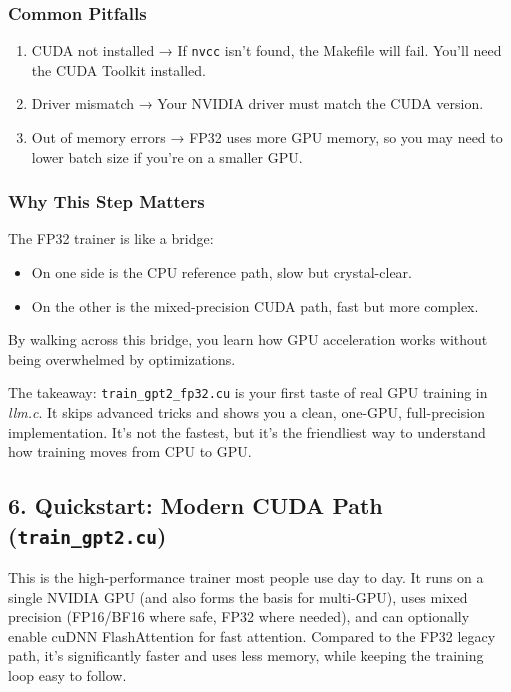 \documentclass[
  letterpaper,
  DIV=11,
  numbers=noendperiod]{scrreprt}
\providecommand{\tightlist}{%
  \setlength{\itemsep}{0pt}\setlength{\parskip}{0pt}}
\begin{document}
\subsubsection{Common Pitfalls}\label{common-pitfalls}

\begin{enumerate}
\def\labelenumi{\arabic{enumi}.}
\tightlist
\item
  CUDA not installed → If \texttt{nvcc} isn't found, the Makefile will
  fail. You'll need the CUDA Toolkit installed.
\item
  Driver mismatch → Your NVIDIA driver must match the CUDA version.
\item
  Out of memory errors → FP32 uses more GPU memory, so you may need to
  lower batch size if you're on a smaller GPU.
\end{enumerate}

\subsubsection{Why This Step Matters}\label{why-this-step-matters}

The FP32 trainer is like a bridge:

\begin{itemize}
\tightlist
\item
  On one side is the CPU reference path, slow but crystal-clear.
\item
  On the other is the mixed-precision CUDA path, fast but more complex.
\end{itemize}

By walking across this bridge, you learn how GPU acceleration works
without being overwhelmed by optimizations.

The takeaway: \texttt{train\_gpt2\_fp32.cu} is your first taste of real
GPU training in \emph{llm.c}. It skips advanced tricks and shows you a
clean, one-GPU, full-precision implementation. It's not the fastest, but
it's the friendliest way to understand how training moves from CPU to
GPU.

\subsection{\texorpdfstring{6. Quickstart: Modern CUDA Path
(\texttt{train\_gpt2.cu})}{6. Quickstart: Modern CUDA Path (train\_gpt2.cu)}}\label{quickstart-modern-cuda-path-train_gpt2.cu}

This is the high-performance trainer most people use day to day. It runs
on a single NVIDIA GPU (and also forms the basis for multi-GPU), uses
mixed precision (FP16/BF16 where safe, FP32 where needed), and can
optionally enable cuDNN FlashAttention for fast attention. Compared to
the FP32 legacy path, it's significantly faster and uses less memory,
while keeping the training loop easy to follow.
\end{document}
